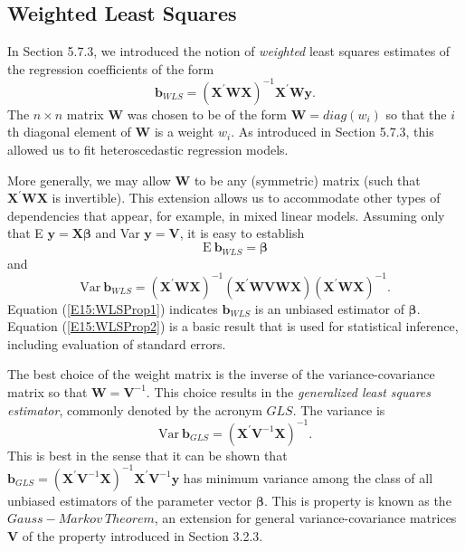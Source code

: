 \subsection{Weighted Least Squares}

In Section 5.7.3, we introduced the notion of \emph{weighted} least
squares estimates of the regression coefficients of the form
\begin{equation}\label{E15:WLSCoefficients}
\mathbf{b}_{WLS} = \left(\mathbf{X}^{\prime} \mathbf{W}\mathbf{X}
\right)^{-1}\mathbf{X}^{\prime} \mathbf{W}\mathbf{y} .
\end{equation}
The $n \times n$ matrix $\mathbf{W}$ was chosen to be of the form
$\mathbf{W} = diag(w_i)$ so that the $i$th diagonal element of
$\mathbf{W}$ is a weight $w_i$. As introduced in Section 5.7.3, this
allowed us to fit heteroscedastic regression models.

More generally, we may allow $\mathbf{W}$ to be any (symmetric)
matrix (such that $\mathbf{X}^{\prime} \mathbf{W}\mathbf{X}$ is
invertible). This extension allows us to accommodate other types of
dependencies that appear, for example, in mixed linear models.
Assuming only that E $\mathbf{y} = \mathbf{X} \boldsymbol \beta$ and
Var $\mathbf{y} = \mathbf{V}$, it is easy to establish
\begin{equation}\label{E15:WLSProp1}
\mathrm{E}~\mathbf{b}_{WLS} = \boldsymbol \beta
\end{equation}
and
\begin{equation}\label{E15:WLSProp2}
\mathrm{Var}~\mathbf{b}_{WLS} =  \left(\mathbf{X}^{\prime}
\mathbf{W}\mathbf{X} \right)^{-1}
 \left(\mathbf{X}^{\prime} \mathbf{W}\mathbf{V}\mathbf{W}\mathbf{X}
\right)
 \left(\mathbf{X}^{\prime} \mathbf{W}\mathbf{X}
\right)^{-1} .
\end{equation}
Equation (\ref{E15:WLSProp1}) indicates $\mathbf{b}_{WLS} $ is an
unbiased estimator of $\boldsymbol \beta$. Equation
(\ref{E15:WLSProp2}) is a basic result that is used for statistical
inference, including evaluation of standard errors.


The best choice of the weight matrix is the inverse of the
variance-covariance matrix so that $\mathbf{W}=\mathbf{V}^{-1}$.
This choice results in the \emph{generalized least squares
estimator}, commonly denoted by the acronym $GLS$. The variance is
\begin{equation}\label{E15:GLSProp2}
\mathrm{Var}~\mathbf{b}_{GLS} =
 \left(\mathbf{X}^{\prime} \mathbf{V}^{-1}\mathbf{X}
\right)^{-1} .
\end{equation}
This is best in the sense that it can be shown that
$\mathbf{b}_{GLS} = \left(\mathbf{X}^{\prime}
\mathbf{V}^{-1}\mathbf{X} \right)^{-1}\mathbf{X}^{\prime}
\mathbf{V}^{-1}\mathbf{y}$ has minimum variance among the class of
all unbiased estimators of the parameter vector $\boldsymbol \beta$.
This is property is known as the $Gauss-Markov ~Theorem$, an
extension for general variance-covariance matrices $\mathbf{V}$ of
the property introduced in Section 3.2.3.


